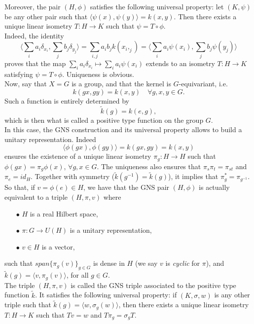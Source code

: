 Moreover, the pair $(H,\phi)$ satisfies the following universal property: let $(K,\psi)$ be any other pair such that $\langle \psi(x),\psi(y) \rangle = k(x,y)$. Then there exists a unique linear isometry $T: H\rightarrow K$ such that $\psi = T \circ \phi$.\\

Indeed, the identity 
\[\langle \sum_i a_i \delta_{x_i}, \sum_j b_j \delta_{y_j} \rangle  = \sum_{i,j} a_i b_j k(x_i,_j) =\langle \sum_i a_i \psi(x_i), \sum_j b_j \psi(y_j) \rangle\]
proves that the map $\sum_i a_i \delta_{x_i}\mapsto  \sum_i a_i \psi(x_i)$ extends to an isometry $T:H \rightarrow K $ satisfying $\psi = T \circ \phi$. Uniqueness is obvious.\\

Now, say that $X=G$ is a group, and that the kernel is $G$-equivariant, i.e.
\[k(gx,gy) = k(x,y)\quad \forall g,x,y\in G.\]
Such a function is entirely determined by 
\[\tilde k (g) = k(e,g),\]
which is then what is called a positive type function on the group $G$.\\

In this case, the GNS construction and its universal property allows to build a unitary representation. Indeed 
\[\langle \phi(gx),\phi(gy) \rangle = k(gx,gy) = k(x,y)\] 
ensures the existence of a unique linear isometry $\pi_g: H \rightarrow H$ such that $\phi(gx) = \pi_g \phi(x)$, $\forall g,x \in G$. The uniqueness also ensures that $\pi_s \pi_t = \pi_{st} $ and $\pi_e = id_H$. Together with symmetry ($\tilde k(g^{-1})=\tilde k(g)$), it implies that $\pi_g^*=\pi_{g^{-1}}$. So that, if $v= \phi(e)\in H$, we have that the GNS pair $(H,\phi)$ is actually equivalent to a triple $(H,\pi, v)$ where 
\begin{itemize}
\item[$\bullet$] $H$ is a real Hilbert space,
\item[$\bullet$] $\pi : G\rightarrow U(H)$ is a unitary representation, 
\item[$\bullet$] $v\in H$ is a vector,
\end{itemize}
such that $span \{ \pi_g (v)\}_{g\in G}$ is dense in $H$ (we say $v$ is \textit{cyclic} for $\pi$), and $\tilde k(g)=\langle v , \pi_g (v)\rangle$, for all $g\in G$.\\

The triple $(H,\pi,v)$ is called the GNS triple associated to the positive type function $\tilde k$. It satisfies the following universal property: if $(K,\sigma , w)$ is any other triple such that $\tilde k(g)=\langle w , \sigma_g (w)\rangle$, then there exists a unique linear isometry $T: H\rightarrow K $ such that $Tv= w$ and $T\pi_g = \sigma_g T$.\\

